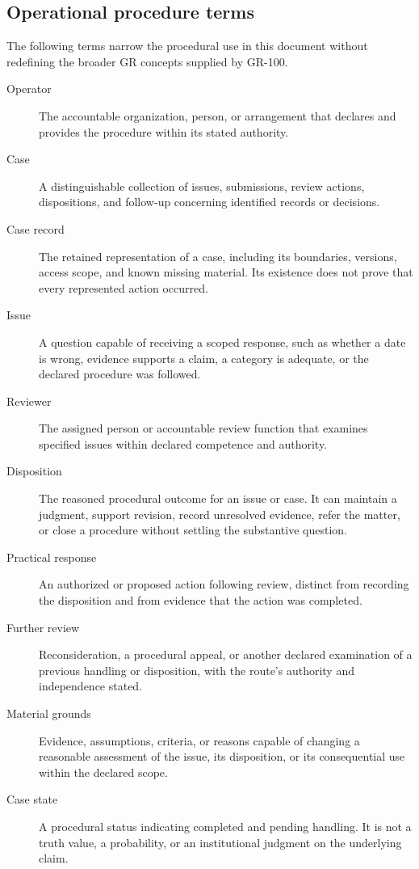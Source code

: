 \documentclass[11pt,a4paper]{article}
\begin{document}
\subsection{Operational procedure terms}
The following terms narrow the procedural use in this document without redefining the broader GR concepts supplied by GR-100.
\begin{description}
\item[Operator] The accountable organization, person, or arrangement that declares and provides the procedure within its stated authority.
\item[Case] A distinguishable collection of issues, submissions, review actions, dispositions, and follow-up concerning identified records or decisions.
\item[Case record] The retained representation of a case, including its boundaries, versions, access scope, and known missing material. Its existence does not prove that every represented action occurred.
\item[Issue] A question capable of receiving a scoped response, such as whether a date is wrong, evidence supports a claim, a category is adequate, or the declared procedure was followed.
\item[Reviewer] The assigned person or accountable review function that examines specified issues within declared competence and authority.
\item[Disposition] The reasoned procedural outcome for an issue or case. It can maintain a judgment, support revision, record unresolved evidence, refer the matter, or close a procedure without settling the substantive question.
\item[Practical response] An authorized or proposed action following review, distinct from recording the disposition and from evidence that the action was completed.
\item[Further review] Reconsideration, a procedural appeal, or another declared examination of a previous handling or disposition, with the route's authority and independence stated.
\item[Material grounds] Evidence, assumptions, criteria, or reasons capable of changing a reasonable assessment of the issue, its disposition, or its consequential use within the declared scope.
\item[Case state] A procedural status indicating completed and pending handling. It is not a truth value, a probability, or an institutional judgment on the underlying claim.
\end{description}
\end{document}
